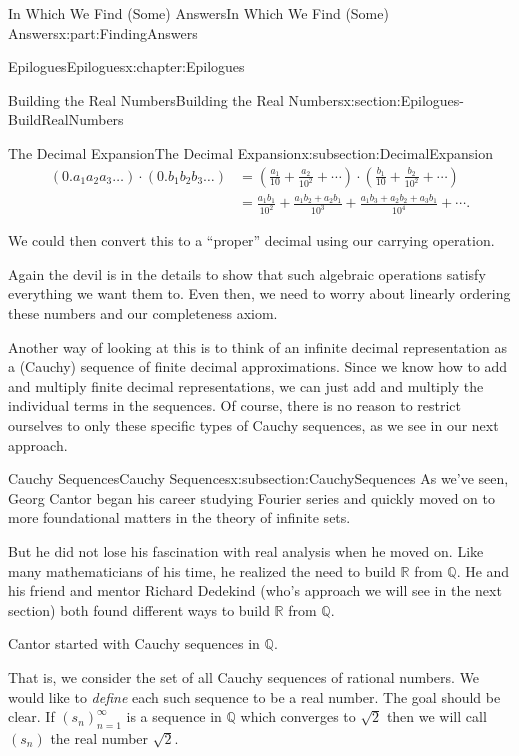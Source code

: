 \documentclass[oneside,10pt,]{book}
\numberwithin{equation}{section}
\newcommand{\RR}{\mathbb {R}}
\newcommand{\QQ}{\mathbb {Q}}
\newcommand{\amp}{&}
\begin{document}
\begin{partptx}{In Which We Find (Some) Answers}{}{In Which We Find (Some) Answers}{}{}{x:part:FindingAnswers}
\begin{chapterptx}{Epilogues}{}{Epilogues}{}{}{x:chapter:Epilogues}
\begin{sectionptx}{Building the Real Numbers}{}{Building the Real Numbers}{}{}{x:section:Epilogues-BuildRealNumbers}
\begin{subsectionptx}{The Decimal Expansion}{}{The Decimal Expansion}{}{}{x:subsection:DecimalExpansion}
\begin{align*}
(0.a_1a_2a_3\ldots)\cdot(0.b_1b_2b_3\ldots) \amp =\left(\frac{a_1}{10}+\frac{a_2}{10^2}+\cdots\right) \cdot\left(\frac{b_1}{10}+\frac{b_2}{10^2}+\cdots\right)\\
\amp =\frac{a_1b_1}{10^2}+\frac{a_1b_2+a_2b_1}{10^3}+\frac{a_1b_3+a_2b_2+a_3b_1}{10^4}+\cdots\text{.}
\end{align*}
%
\par
We could then convert this to a ``proper'' decimal using our carrying operation.%
\par
Again the devil is in the details to show that such algebraic operations satisfy everything we want them to. Even then, we need to worry about linearly ordering these numbers and our completeness axiom.%
\par
Another way of looking at this is to think of an infinite decimal representation as a (Cauchy) sequence of finite decimal approximations. Since we know how to add and multiply finite decimal representations, we can just add and multiply the individual terms in the sequences. Of course, there is no reason to restrict ourselves to only these specific types of Cauchy sequences, as we see in our next approach.%
\end{subsectionptx}
%
%
\typeout{************************************************}
\typeout{************************************************}
%
\begin{subsectionptx}{Cauchy Sequences}{}{Cauchy Sequences}{}{}{x:subsection:CauchySequences}
As we've seen, Georg Cantor  began his career studying Fourier series and quickly moved on to more foundational matters in the theory of infinite sets.%
\par
But he did not lose his fascination with real analysis when he moved on. Like many mathematicians of his time, he realized the need to build \(\RR\) from \(\QQ\). He and his friend and mentor Richard Dedekind  (who's approach we will see in the next section) both found different ways to build \(\RR\) from \(\QQ\).%
\par
Cantor started with Cauchy sequences in \(\QQ\).%
\par
That is, we consider the set of all Cauchy sequences of rational numbers. We would like to \emph{define} each such sequence to be a real number. The goal should be clear. If \(\left(s_n\right)_{n=1}^\infty\) is a sequence in \(\QQ\) which converges to \(\sqrt{2}\) then we will call \(\left(s_n\right)\) the real number \(\sqrt{2}\).%

\end{subsectionptx}
\end{sectionptx}
\end{chapterptx}
\end{partptx}
\end{document}
